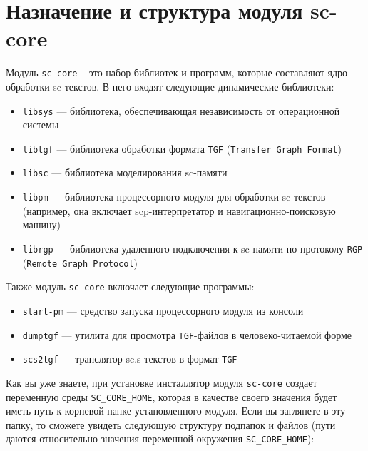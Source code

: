 \section{Назначение и структура модуля sc-core}

Модуль \texttt{sc-core} – это набор библиотек и программ, которые
составляют ядро обработки sc-текстов. В него входят следующие
динамические библиотеки:

\begin{itemize}
\item \texttt{libsys} --- библиотека, обеспечивающая независимость от
  операционной системы
\item \texttt{libtgf} --- библиотека обработки формата \texttt{TGF}
  (\texttt{Transfer Graph Format})
\item \texttt{libsc} --- библиотека моделирования sc-памяти
\item \texttt{libpm} --- библиотека процессорного модуля для обработки
  sc-текстов (например, она включает scp-интерпретатор и
  навигационно-поисковую машину)
\item \texttt{librgp} --- библиотека удаленного подключения к
  sc-памяти по протоколу \texttt{RGP} (\texttt{Remote Graph Protocol})
\end{itemize}

Также модуль \texttt{sc-core} включает следующие программы:

\begin{itemize}
\item \texttt{start-pm} --- средство запуска процессорного модуля из консоли
\item \texttt{dumptgf} --- утилита для просмотра \texttt{TGF}-файлов в
  человеко-читаемой форме
\item \texttt{scs2tgf} --- транслятор sc.s-текстов в формат
  \texttt{TGF}
\end{itemize}

Как вы уже знаете, при установке инсталлятор модуля \texttt{sc-core}
создает переменную среды \verb|SC_CORE_HOME|, которая в качестве
своего значения будет иметь путь к корневой папке установленного
модуля. Если вы заглянете в эту папку, то сможете увидеть следующую
структуру подпапок и файлов (пути даются относительно значения
переменной окружения \verb|SC_CORE_HOME|):

